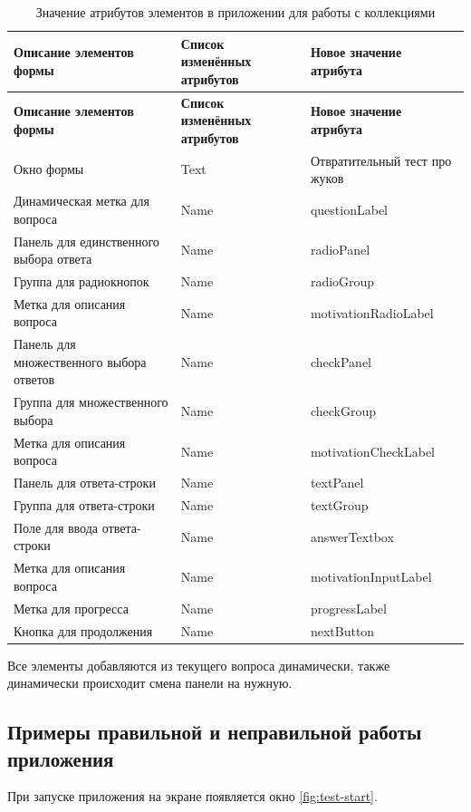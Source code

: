\begin{xltabular}{\textwidth}{| m{0.3\textwidth} | m{0.3\textwidth} | m{0.3\textwidth} |}

\hline
\textbf{Описание элементов формы} & \textbf{Список изменённых атрибутов} & \textbf{Новое значение атрибута} \\
\hline
\endfirsthead

\hline
\textbf{Описание элементов формы} & \textbf{Список изменённых атрибутов} & \textbf{Новое значение атрибута} \\
\hline
\endhead

\hline
\endfoot

\hline
\caption{Значение атрибутов элементов в приложении для работы с коллекциями}
\label{tab:test-form}
\endlastfoot

Окно формы & Text & Отвратительный тест про жуков \\
Динамическая метка для вопроса & Name & questionLabel \\

Панель\cite{panel} для единственного выбора ответа & Name & radioPanel \\
Группа\cite{group} для радиокнопок & Name & radioGroup \\
Метка для описания вопроса & Name & motivationRadioLabel \\

Панель для множественного выбора ответов & Name & checkPanel \\
Группа для множественного выбора & Name & checkGroup \\
Метка для описания вопроса & Name & motivationCheckLabel \\

Панель для ответа-строки & Name & textPanel \\
Группа для ответа-строки & Name & textGroup \\
Поле для ввода ответа-строки & Name & answerTextbox \\
Метка для описания вопроса & Name & motivationInputLabel \\

Метка для прогресса & Name & progressLabel \\
Кнопка для продолжения & Name & nextButton \\
\end{xltabular}

Все элементы добавляются из текущего вопроса динамически, также динамически происходит смена панели на нужную.

\subsection{Примеры правильной и неправильной работы приложения}
При запуске приложения на экране появляется окно \ref{fig:test-start}.

